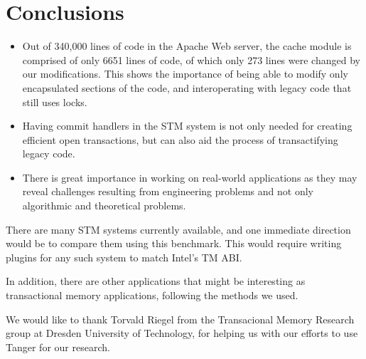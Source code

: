 \documentclass[preprint,natbib,11pt]{sigplanconf}
\begin{document}
\section{Conclusions}\label{sec:conclusions}
\begin{itemize}
  \item Out of 340,000 lines of code in the Apache Web server, the cache module
is comprised of only 6651 lines of code, of which only 273 lines were changed by
our modifications. This shows the importance of being able to modify only
encapsulated sections of the code, and interoperating with legacy code that
still uses locks.  
  \item Having commit handlers in the STM system is not only needed for creating
efficient open transactions, but can also aid the process of transactifying
legacy code.
  \item There is great importance in working on real-world applications as they
may reveal challenges resulting from engineering problems and not only
algorithmic and theoretical problems.
\end{itemize}
There are many STM systems currently available, and one immediate direction
would be to compare them using this benchmark. This would require writing
plugins for any such system to match Intel's TM ABI. 

In addition, there are other applications that might be interesting as
transactional memory applications, following the methods we used.



\acks

We would like to thank Torvald Riegel from the Transacional Memory Research
group at Dresden University of Technology, for helping us with our efforts to
use {\sc Tanger} for our research.



%
%


\end{document}
